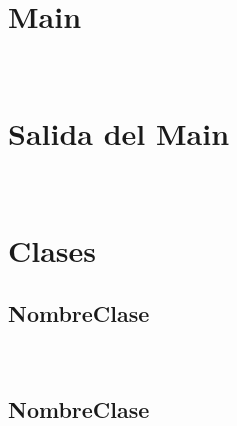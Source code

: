 \section{Main}


\begin{lstlisting}[language=Java, caption=NombreClase]
 
\end{lstlisting}


\section{Salida del Main}

\begin{lstlisting}[language=Java, caption=NombreClase]
 
\end{lstlisting}


\section{Clases}

\subsection{NombreClase}

\begin{lstlisting}[language=Java, caption=NombreClase]
 
\end{lstlisting}


\subsection{NombreClase}

\begin{lstlisting}[language=Java, caption=NombreClase]
 
\end{lstlisting}


